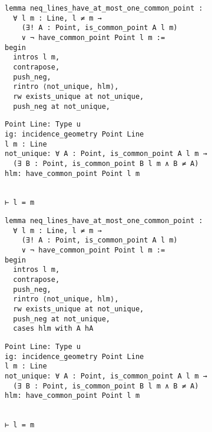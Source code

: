 \begin{frame}[fragile]
	\begin{multicols}{2}
		\begin{lstlisting}
lemma neq_lines_have_at_most_one_common_point :
  ∀ l m : Line, l ≠ m → 
    (∃! A : Point, is_common_point A l m) 
    ∨ ¬ have_common_point Point l m := 
begin
  intros l m,
  contrapose,
  push_neg,
  rintro ⟨not_unique, hlm⟩,
  rw exists_unique at not_unique,
  push_neg at not_unique,
\end{lstlisting}
		\columnbreak
		\begin{lstlisting}
Point Line: Type u
ig: incidence_geometry Point Line
l m : Line
not_unique: ∀ A : Point, is_common_point A l m → 
  (∃ B : Point, is_common_point B l m ∧ B ≠ A)
hlm: have_common_point Point l m


⊢ l = m
		\end{lstlisting}
	\end{multicols}
\end{frame}










\begin{frame}[fragile]
	\begin{multicols}{2}
		\begin{lstlisting}
lemma neq_lines_have_at_most_one_common_point :
  ∀ l m : Line, l ≠ m → 
    (∃! A : Point, is_common_point A l m) 
    ∨ ¬ have_common_point Point l m := 
begin
  intros l m,
  contrapose,
  push_neg,
  rintro ⟨not_unique, hlm⟩,
  rw exists_unique at not_unique,
  push_neg at not_unique,
  cases hlm with A hA
\end{lstlisting}
		\columnbreak
		\begin{lstlisting}
Point Line: Type u
ig: incidence_geometry Point Line
l m : Line
not_unique: ∀ A : Point, is_common_point A l m → 
  (∃ B : Point, is_common_point B l m ∧ B ≠ A)
hlm: have_common_point Point l m


⊢ l = m
		\end{lstlisting}
	\end{multicols}
\end{frame}










